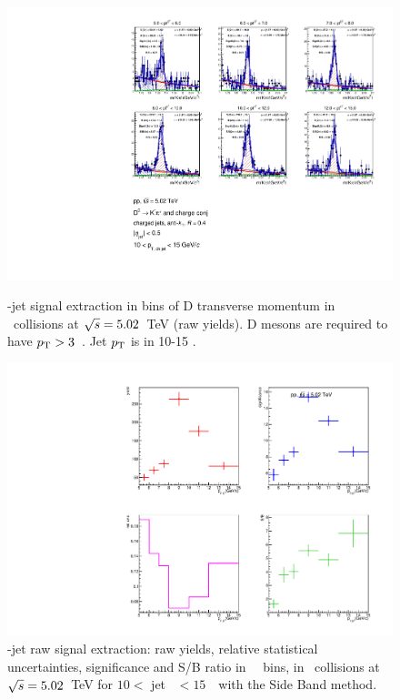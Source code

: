 \begin{figure}[bth]
\centering
\begin{minipage}{.65\textwidth}
  \centering
  \includegraphics[width=\linewidth]{pp_2sig/R4_jetbin_10_15/invMass_pTD5}
\caption{\Dzero-jet signal extraction in bins of D transverse momentum in \pp\ collisions at $\sqrt{s}=5.02$~TeV (raw yields). D mesons are required to have $p_{\rm T}>3$~\GeVc. Jet $p_{\rm T}$ is in 10-15 \GeVc.
}
\label{fig:eq_pp_InvMass_Dzero_10_15_R4}
\end{minipage}%
\begin{minipage}{.4\textwidth}
  \centering
  \includegraphics[width=\linewidth]{pp_2sig/R4_jetbin_10_15/signalParams_pTD5}
\caption{%
\Dzero-jet raw signal extraction: raw yields, relative statistical uncertainties, significance and S/B ratio in \Dzero\ \pt\ bins, in \pp\ collisions at $\sqrt{s}=5.02$~TeV for $10<$ jet \pt\ $<15$~\GeVc\ with the Side Band method.
}
\label{fig:eq_pp_signalParams_10_15_R4}
\end{minipage}
\end{figure}
